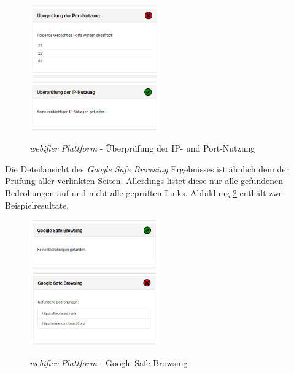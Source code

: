 \begin{figure}[H]
\centerline{%
\includegraphics[width=0.5\textwidth]{images/platform/portscan-malicious}%
\includegraphics[width=0.5\textwidth]{images/platform/ipscan-clean}%
}%
\caption{\textit{webifier Plattform} - Überprüfung der IP- und Port-Nutzung}
\label{fig:platform-result-portscan}
\end{figure}

Die Deteilansicht des \textit{Google Safe Browsing} Ergebnisses ist ähnlich dem der Prüfung aller
verlinkten Seiten. Allerdings listet diese nur alle gefundenen Bedrohungen auf und nicht alle
geprüften Links. Abbildung \ref{fig:platform-result-google-safe-browsing} enthält zwei Beispielresultate.

\begin{figure}[H]
\centerline{%
\includegraphics[width=0.5\textwidth]{images/platform/google-safe-browsing-clean}%
\includegraphics[width=0.5\textwidth]{images/platform/google-safe-browsing-malicious}%
}%
\caption{\textit{webifier Plattform} - Google Safe Browsing}
\label{fig:platform-result-google-safe-browsing}
\end{figure}

